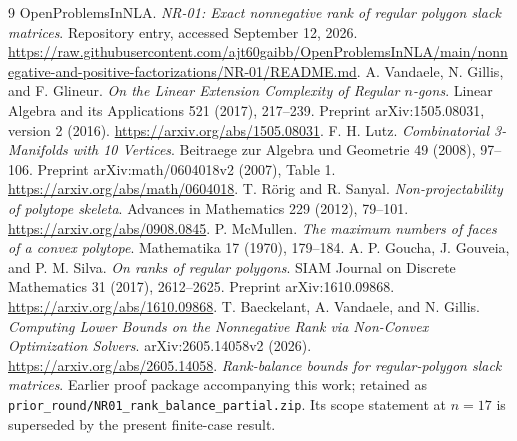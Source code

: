 \documentclass[11pt]{article}
\theoremstyle{definition}
\begin{document}
\begin{thebibliography}{9}
 OpenProblemsInNLA. \emph{NR-01: Exact nonnegative rank of regular polygon slack matrices}. Repository entry, accessed September 12, 2026. \url{https://raw.githubusercontent.com/ajt60gaibb/OpenProblemsInNLA/main/nonnegative-and-positive-factorizations/NR-01/README.md}.
 A. Vandaele, N. Gillis, and F. Glineur. \emph{On the Linear Extension Complexity of Regular $n$-gons}. Linear Algebra and its Applications 521 (2017), 217--239. Preprint arXiv:1505.08031, version 2 (2016). \url{https://arxiv.org/abs/1505.08031}.
 F. H. Lutz. \emph{Combinatorial 3-Manifolds with 10 Vertices}. Beitraege zur Algebra und Geometrie 49 (2008), 97--106. Preprint arXiv:math/0604018v2 (2007), Table 1. \url{https://arxiv.org/abs/math/0604018}.
 T. R\"orig and R. Sanyal. \emph{Non-projectability of polytope skeleta}. Advances in Mathematics 229 (2012), 79--101. \url{https://arxiv.org/abs/0908.0845}.
 P. McMullen. \emph{The maximum numbers of faces of a convex polytope}. Mathematika 17 (1970), 179--184.
 A. P. Goucha, J. Gouveia, and P. M. Silva. \emph{On ranks of regular polygons}. SIAM Journal on Discrete Mathematics 31 (2017), 2612--2625. Preprint arXiv:1610.09868. \url{https://arxiv.org/abs/1610.09868}.
 T. Baeckelant, A. Vandaele, and N. Gillis. \emph{Computing Lower Bounds on the Nonnegative Rank via Non-Convex Optimization Solvers}. arXiv:2605.14058v2 (2026). \url{https://arxiv.org/abs/2605.14058}.
 \emph{Rank-balance bounds for regular-polygon slack matrices}. Earlier proof package accompanying this work; retained as \texttt{prior\_round/NR01\_rank\_balance\_partial.zip}. Its scope statement at $n=17$ is superseded by the present finite-case result.
\end{thebibliography}
\end{document}

